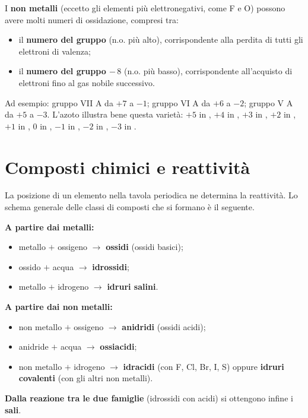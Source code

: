 \documentclass[11pt, a4paper, openright]{book}
\begin{document}
I \textbf{non metalli} (eccetto gli elementi più elettronegativi, come F e O) possono avere molti numeri di ossidazione, compresi tra:
\begin{itemize}
    \item il \textbf{numero del gruppo} (n.o. più alto), corrispondente alla perdita di tutti gli elettroni di valenza;
    \item il \textbf{numero del gruppo $-\,8$} (n.o. più basso), corrispondente all'acquisto di elettroni fino al gas nobile successivo.
\end{itemize}
Ad esempio: gruppo VII A da $+7$ a $-1$; gruppo VI A da $+6$ a $-2$; gruppo V A da $+5$ a $-3$. L'azoto illustra bene questa varietà: $+5$ in , $+4$ in , $+3$ in , $+2$ in , $+1$ in , $0$ in , $-1$ in , $-2$ in , $-3$ in .

\newpage

\section{Composti chimici e reattività}
La posizione di un elemento nella tavola periodica ne determina la reattività. Lo schema generale delle classi di composti che si formano è il seguente.

\textbf{A partire dai metalli:}
\begin{itemize}
    \item metallo $+$ ossigeno $\longrightarrow$ \textbf{ossidi} (ossidi basici);
    \item ossido $+$ acqua $\longrightarrow$ \textbf{idrossidi};
    \item metallo $+$ idrogeno $\longrightarrow$ \textbf{idruri salini}.
\end{itemize}

\textbf{A partire dai non metalli:}
\begin{itemize}
    \item non metallo $+$ ossigeno $\longrightarrow$ \textbf{anidridi} (ossidi acidi);
    \item anidride $+$ acqua $\longrightarrow$ \textbf{ossiacidi};
    \item non metallo $+$ idrogeno $\longrightarrow$ \textbf{idracidi} (con F, Cl, Br, I, S) oppure \textbf{idruri covalenti} (con gli altri non metalli).
\end{itemize}

\textbf{Dalla reazione tra le due famiglie} (idrossidi con acidi) si ottengono infine i \textbf{sali}.
\end{document}
